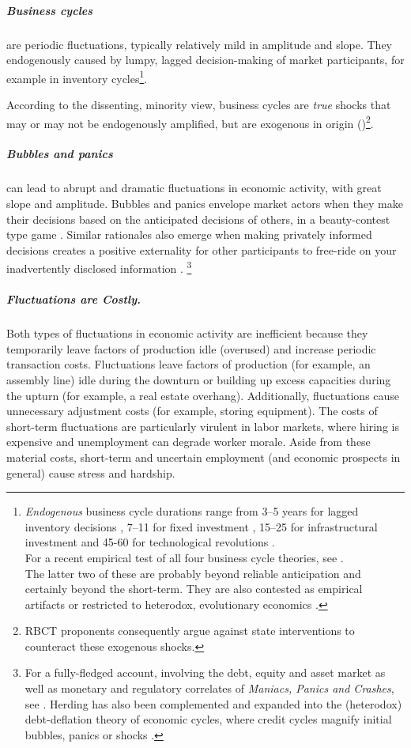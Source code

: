 \subparagraph{Business cycles} are periodic fluctuations, typically relatively mild in amplitude and slope. They endogenously caused by lumpy, lagged decision-making of market participants, for example in inventory cycles\footnote{
	\emph{Endogenous} business cycle durations range from 3--5 years for lagged inventory decisions \citep{Kitchin1923}, 7--11 for fixed investment \citep{Juglar1862}, 15--25 for infrastructural investment \citep{Kuznets1930} and 45-60 for technological revolutions \citep{Kondratiev1925}. \\ For a recent empirical test of all four business cycle theories, see \cite{Korotayev2010}. \\ The latter two of these are probably beyond reliable anticipation and certainly beyond the short-term. They are also contested as empirical artifacts \citep{Howrey1968} or restricted to heterodox, evolutionary economics \citep{Modelski2010}.}.

According to the dissenting, minority view, business cycles are \emph{true} shocks that may or may not be endogenously amplified, but are exogenous in origin (\citealt{Kydland1982})\footnote{
	\gls{RBCT} proponents consequently argue against state interventions to counteract these exogenous shocks.}.

\subparagraph{Bubbles and panics} can lead to abrupt and dramatic fluctuations in economic activity, with great slope and amplitude. Bubbles and panics envelope market actors when they make their decisions based on the anticipated decisions of others, in a beauty-contest type game \citep{Keynes1936}. Similar rationales also emerge when making privately informed decisions creates a positive externality for other participants to free-ride on your inadvertently disclosed information \citep{Banerjee-1992-aa}.
\footnote{
	For a fully-fledged account, involving the debt, equity and asset market as well as monetary and regulatory correlates of \emph{Maniacs, Panics and Crashes}, see \cite{KindlebergerAliber-2005-aa}. Herding has also been complemented and expanded into the (heterodox) debt-deflation theory of economic cycles, where credit cycles magnify initial bubbles, panics or shocks \citep{Fisher1933}.
}

\subparagraph{Fluctuations are Costly.}
Both types of fluctuations in economic activity are inefficient because they temporarily leave factors of production idle (overused) and increase periodic transaction costs.
Fluctuations  leave factors of production (for example, an assembly line) idle during the downturn or building up excess capacities during the upturn (for example, a real estate overhang).
Additionally, fluctuations cause unnecessary adjustment costs (for example, storing equipment).
The costs of short-term fluctuations are particularly virulent in labor markets, where hiring is expensive and unemployment can degrade worker morale. Aside from these material costs, short-term and uncertain employment (and economic prospects in general) cause stress and hardship.~%

